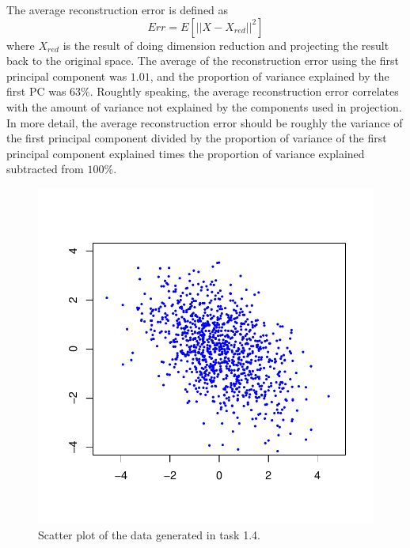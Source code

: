 \documentclass{article}
\begin{document}
The average reconstruction error is defined as
$$ Err = E\left[\left||X-X_{red}|\right|^2\right]$$
where $X_{red}$ is the result of doing dimension reduction and projecting the result back to the original space.
The average of the reconstruction error using the first principal component was
$1.01$, and the proportion of variance explained by the first PC was $63 \%$.
Roughtly speaking, the average reconstruction error correlates with the amount of variance not explained by the components used in projection.
In more detail, the average reconstruction error should be roughly the variance of the
first principal component divided by the proportion of variance of the
first principal component explained times the proportion of variance
explained subtracted from $100 \%$.
\begin{figure} \centering
	\includegraphics[scale=0.7]{vscatter}
	\caption{Scatter plot of the data generated in task 1.4.} \label{fig:vscatter}
\end{figure}
\end{document}
